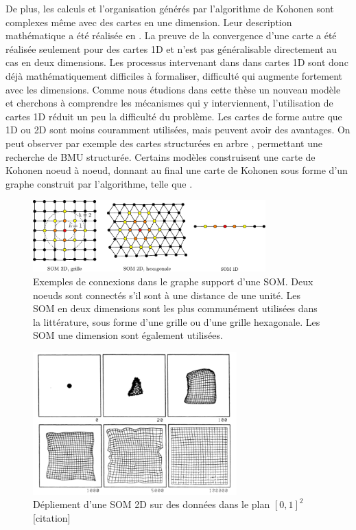 De plus, les calculs et l'organisation générés par l'algorithme de Kohonen sont complexes même avec des cartes en une dimension. Leur description mathématique a été réalisée en \cite{cottrell_theoretical_2016,cottrell_theoretical_1998,fort_soms_2006}. La preuve de la convergence d'une carte a été réalisée seulement pour des cartes 1D et n'est pas généralisable directement au cas en deux dimensions. Les processus intervenant dans dans cartes 1D sont donc déjà mathématiquement difficiles à formaliser, difficulté qui augmente fortement avec les dimensions. Comme nous étudions dans cette thèse un nouveau modèle et cherchons à comprendre les mécanismes qui y interviennent, l'utilisation de cartes 1D réduit un peu la difficulté du problème. 
Les cartes de forme autre que 1D ou 2D sont moins couramment utilisées, mais peuvent avoir des avantages. On peut observer par exemple des cartes structurées en arbre \cite{koikkalainen_self-organizing_1990}, permettant une recherche de BMU structurée. Certains modèles construisent une carte de Kohonen noeud à noeud, donnant au final une carte de Kohonen sous forme d'un graphe construit par l'algorithme, telle que \cite{alahakoon_dynamic_2000}. 
\begin{figure}
\centering
\includegraphics[width=0.8\textwidth]{soms_topologies}
\caption{Exemples de connexions dans le graphe support d'une SOM. Deux noeuds sont connectés s'il sont à une distance de une unité. Les SOM en deux dimensions sont les plus communément utilisées dans la littérature, sous forme d'une grille ou d'une grille hexagonale. Les SOM une dimension sont également utilisées.}
\label{fig:topo}
\end{figure}


\begin{figure}
\centering
\includegraphics[width=0.7\textwidth]{som2d}
\caption{Dépliement d'une SOM 2D sur des données dans le plan $[0,1]^2$ [citation]}
\label{fig:som2d}
\end{figure}

